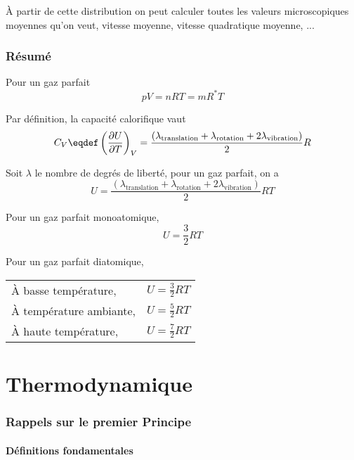 À partir de cette distribution on peut calculer
toutes les valeurs microscopiques moyennes qu'on veut,
vitesse moyenne, vitesse quadratique moyenne, ...

\section{Résumé}

Pour un gaz parfait
\[ pV = nRT = mR^*T \]

Par définition, la capacité calorifique vaut
\[ C_V \eqdef \left(\fpart{U}{T}\right)_V
= \frac{(\lambda_\mathrm{translation} + \lambda_\mathrm{rotation} +
2\lambda_\mathrm{vibration})}{2}R \]

Soit $\lambda$ le nombre de degrés de liberté,
pour un gaz parfait, on a
\[ U = \frac{(\lambda_\mathrm{translation} + \lambda_\mathrm{rotation} +
2\lambda_\mathrm{vibration})}{2}RT \]

Pour un gaz parfait monoatomique,
\[ U = \frac 32 RT \]

Pour un gaz parfait diatomique,
\begin{center}
  \begin{tabular}{|l|l|}
    \hline
    À basse température, &
    \( U = \frac 32 RT \)\\
    À température ambiante, &
    \( U = \frac 52 RT \)\\
    À haute température, &
    \( U = \frac 72 RT \)\\
    \hline
  \end{tabular}
\end{center}

\part{Thermodynamique}
\section{Rappels sur le premier Principe}
\subsection{Définitions fondamentales}
